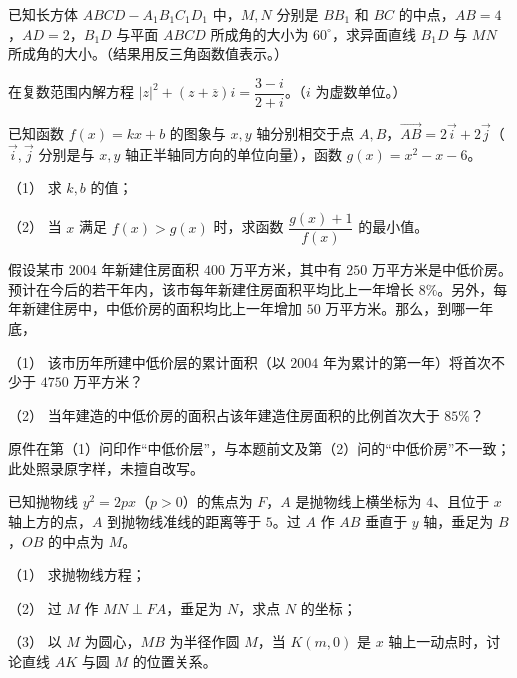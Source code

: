 \Needspace{0.4\textheight}
\begin{question}
已知长方体 $ABCD-A_1B_1C_1D_1$ 中，$M,N$ 分别是 $BB_1$ 和 $BC$ 的中点，$AB=4$，$AD=2$，$B_1D$ 与平面 $ABCD$ 所成角的大小为 $60^\circ$，求异面直线 $B_1D$ 与 $MN$ 所成角的大小。（结果用反三角函数值表示。）
\nopagebreak[4]
\begin{center}\end{center}
\nopagebreak[4]
\end{question}
\begin{question}
在复数范围内解方程 $|z|^2+(z+\overline z)i=\dfrac{3-i}{2+i}$。（$i$ 为虚数单位。）

\end{question}
\begin{question}
已知函数 $f(x)=kx+b$ 的图象与 $x,y$ 轴分别相交于点 $A,B$，$\overrightarrow{AB}=2\vec i+2\vec j$（$\vec i,\vec j$ 分别是与 $x,y$ 轴正半轴同方向的单位向量），函数 $g(x)=x^2-x-6$。

（1） 求 $k,b$ 的值；

（2） 当 $x$ 满足 $f(x)>g(x)$ 时，求函数 $\dfrac{g(x)+1}{f(x)}$ 的最小值。

\end{question}
\begin{question}
假设某市 $2004$ 年新建住房面积 $400$ 万平方米，其中有 $250$ 万平方米是中低价房。预计在今后的若干年内，该市每年新建住房面积平均比上一年增长 $8\%$。另外，每年新建住房中，中低价房的面积均比上一年增加 $50$ 万平方米。那么，到哪一年底，

（1） 该市历年所建中低价层的累计面积（以 $2004$ 年为累计的第一年）将首次不少于 $4750$ 万平方米？

（2） 当年建造的中低价房的面积占该年建造住房面积的比例首次大于 $85\%$？

\begin{gktip}
原件在第（1）问印作“中低价层”，与本题前文及第（2）问的“中低价房”不一致；此处照录原字样，未擅自改写。
\end{gktip}

\Needspace{0.4\textheight}
\end{question}
\begin{question}
已知抛物线 $y^2=2px$（$p>0$）的焦点为 $F$，$A$ 是抛物线上横坐标为 $4$、且位于 $x$ 轴上方的点，$A$ 到抛物线准线的距离等于 $5$。过 $A$ 作 $AB$ 垂直于 $y$ 轴，垂足为 $B$，$OB$ 的中点为 $M$。

（1） 求抛物线方程；

（2） 过 $M$ 作 $MN\perp FA$，垂足为 $N$，求点 $N$ 的坐标；

（3） 以 $M$ 为圆心，$MB$ 为半径作圆 $M$，当 $K(m,0)$ 是 $x$ 轴上一动点时，讨论直线 $AK$ 与圆 $M$ 的位置关系。
\nopagebreak[4]
\begin{center}\end{center}
\nopagebreak[4]
\end{question}

